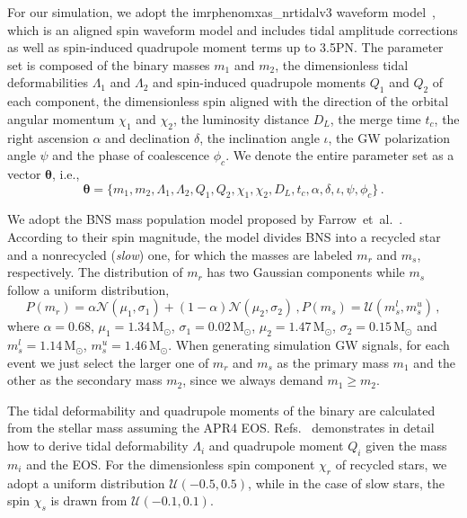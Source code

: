\documentclass[a4paper,11pt]{article}
\begin{document}
For our simulation, we adopt the {\sc imrphenomxas\_nrtidalv3} waveform model~\cite{Abac:2023ujg}, 
which is an aligned spin waveform model and includes tidal amplitude corrections as well as spin-induced quadrupole moment terms up to 3.5PN. 
The parameter set is composed of the binary masses $m_1$ and $m_2$, the 
dimensionless tidal deformabilities $\Lambda_1$ and $\Lambda_2$ and spin-induced 
quadrupole moments $Q_1$ and $Q_2$ of each component, the dimensionless spin 
aligned with the direction of the orbital angular momentum $\chi_1$ and $\chi_2$, the 
luminosity distance $D_L$, the merge time $t_c$, the right ascension $\alpha$ and 
declination $\delta$, the inclination angle $\iota$, the GW polarization angle 
$\psi$ and the phase of coalescence $\phi_c$. We denote the entire parameter set as a vector $\bm{\theta}$, i.e.,
\begin{equation}
\label{parameter set}
\bm{\theta} = \{m_1,m_2,\Lambda_1,\Lambda_2,Q_1,Q_2,\chi_1,\chi_2,D_L,t_c,\alpha,\delta,\iota,\psi,\phi_c\}\,.
\end{equation}

We adopt the BNS mass population model proposed by Farrow~et~al.~\cite{Farrow:2019xnc}. 
According to their spin magnitude, the model divides BNS into a recycled star and a nonrecycled 
(\emph{slow}) one, for which the masses are labeled $m_r$ and $m_s$, respectively. 
The distribution of $m_r$ has two Gaussian components while $m_s$ follow a uniform distribution,
\begin{subequations}
\label{mass population}
\begin{equation}
    P(m_r) = \alpha \mathcal{N}(\mu_1, \sigma_1) + (1-\alpha) \mathcal{N}(\mu_2, \sigma_2)\,,
\end{equation}
\begin{equation}
    P(m_s) = \mathcal{U}(m_s^l, m_s^u)\,,
\end{equation}
\end{subequations}
where $\alpha=0.68$, $\mu_1=1.34\,\mathrm{M}_{\odot}$, $\sigma_1=0.02\,\mathrm{M}_
{\odot}$, $\mu_2=1.47\,\mathrm{M}_{\odot}$, $\sigma_2=0.15\,\mathrm{M}_{\odot}$ 
and $m_s^l=1.14\,\mathrm{M}_{\odot}$, $m_s^u=1.46\,\mathrm{M}_{\odot}$. When 
generating simulation GW signals, for each event we just select the larger one of 
$m_r$ and $m_s$ as the primary mass $m_1$ and the other as the secondary mass 
$m_2$, since we always demand $m_1 \geq m_2$.

The tidal deformability and quadrupole moments of the binary are calculated from 
the stellar mass assuming the APR4 EOS. Refs.~\cite{Yagi:2013awa,Atta:2024ckt} 
demonstrates in detail how to derive tidal deformability $\Lambda_i$ and 
quadrupole moment $Q_i$ given the mass $m_i$ and the EOS. For the dimensionless 
spin component $\chi_r$ of recycled stars, we adopt a uniform distribution $\mathcal{U}(-0.5,0.5)$, 
while in the case of slow stars, the spin $\chi_s$ is drawn from $\mathcal{U}(-0.1,0.1)$.
\end{document}

